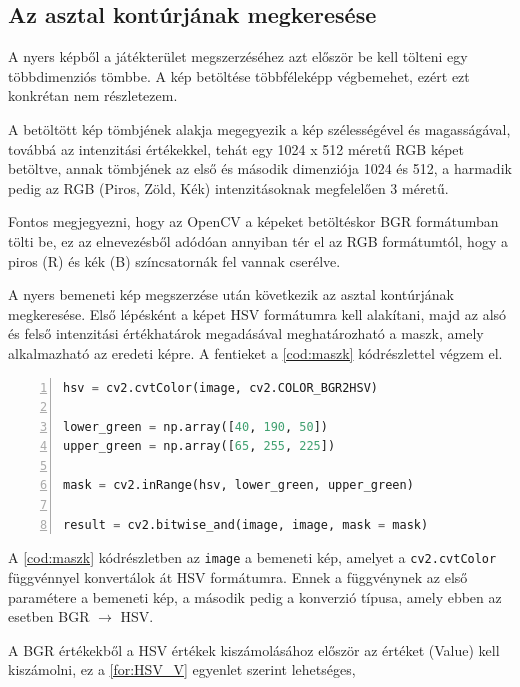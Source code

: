 \subsection{Az asztal kontúrjának megkeresése}
A nyers képből a játékterület megszerzéséhez azt először be kell tölteni egy többdimenziós tömbbe. A kép betöltése többféleképp végbemehet, ezért ezt konkrétan nem részletezem.
\par A betöltött kép tömbjének alakja megegyezik a kép szélességével és magasságával, továbbá az intenzitási értékekkel, tehát egy 1024 x 512 méretű RGB képet betöltve, annak tömbjének az első és második dimenziója 1024 és 512, a harmadik pedig az RGB (Piros, Zöld, Kék) intenzitásoknak megfelelően 3 méretű.
\par Fontos megjegyezni, hogy az OpenCV a képeket betöltéskor BGR formátumban tölti be, ez az elnevezésből adódóan annyiban tér el az RGB formátumtól, hogy a piros (R) és kék (B) színcsatornák fel vannak cserélve.
\par A nyers bemeneti kép megszerzése után következik az asztal kontúrjának megkeresése. Első lépésként a képet HSV formátumra kell alakítani, majd az alsó és felső intenzitási értékhatárok megadásával meghatározható a maszk, amely alkalmazható az eredeti képre.
\newline A fentieket a \ref{cod:maszk} kódrészlettel végzem el.


\vspace{2mm}
\hspace{-10mm}
\begin{minipage}{\linewidth}
\begin{lstlisting}[language=Python, numbers=left, caption={A játékterület maszkolása.}, label={cod:maszk}]
hsv = cv2.cvtColor(image, cv2.COLOR_BGR2HSV)

lower_green = np.array([40, 190, 50])
upper_green = np.array([65, 255, 225])

mask = cv2.inRange(hsv, lower_green, upper_green)

result = cv2.bitwise_and(image, image, mask = mask)
\end{lstlisting}
\end{minipage}

\par A \ref{cod:maszk} kódrészletben az \lstinline{image} a bemeneti kép, amelyet a \lstinline{cv2.cvtColor} függvénnyel \cite{opencv_docs} konvertálok át HSV formátumra. Ennek a függvénynek az első paramétere a bemeneti kép, a második pedig a konverzió típusa, amely ebben az esetben BGR $\rightarrow$ HSV.
\par A BGR értékekből a HSV értékek kiszámolásához először az értéket (Value) kell kiszámolni, ez a \ref{for:HSV_V} egyenlet\cite{opencv_docs} szerint lehetséges,

